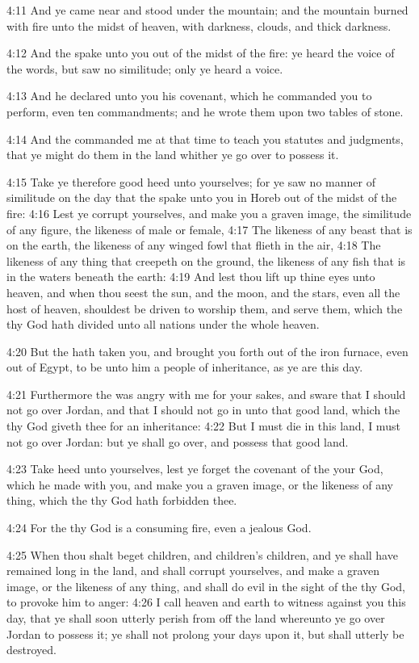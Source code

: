 4:11 And ye came near and stood under the mountain; and the mountain
burned with fire unto the midst of heaven, with darkness, clouds, and
thick darkness.

4:12 And the \LORD spake unto you out of the midst of the fire: ye
heard the voice of the words, but saw no similitude; only ye heard a
voice.

4:13 And he declared unto you his covenant, which he commanded you to
perform, even ten commandments; and he wrote them upon two tables of
stone.

4:14 And the \LORD commanded me at that time to teach you statutes and
judgments, that ye might do them in the land whither ye go over to
possess it.

4:15 Take ye therefore good heed unto yourselves; for ye saw no manner
of similitude on the day that the \LORD spake unto you in Horeb out of
the midst of the fire: 4:16 Lest ye corrupt yourselves, and make you a
graven image, the similitude of any figure, the likeness of male or
female, 4:17 The likeness of any beast that is on the earth, the
likeness of any winged fowl that flieth in the air, 4:18 The likeness
of any thing that creepeth on the ground, the likeness of any fish
that is in the waters beneath the earth: 4:19 And lest thou lift up
thine eyes unto heaven, and when thou seest the sun, and the moon, and
the stars, even all the host of heaven, shouldest be driven to worship
them, and serve them, which the \LORD thy God hath divided unto all
nations under the whole heaven.

4:20 But the \LORD hath taken you, and brought you forth out of the
iron furnace, even out of Egypt, to be unto him a people of
inheritance, as ye are this day.

4:21 Furthermore the \LORD was angry with me for your sakes, and sware
that I should not go over Jordan, and that I should not go in unto
that good land, which the \LORD thy God giveth thee for an inheritance:
4:22 But I must die in this land, I must not go over Jordan: but ye
shall go over, and possess that good land.

4:23 Take heed unto yourselves, lest ye forget the covenant of the
\LORD your God, which he made with you, and make you a graven image, or
the likeness of any thing, which the \LORD thy God hath forbidden thee.

4:24 For the \LORD thy God is a consuming fire, even a jealous God.

4:25 When thou shalt beget children, and children's children, and ye
shall have remained long in the land, and shall corrupt yourselves,
and make a graven image, or the likeness of any thing, and shall do
evil in the sight of the \LORD thy God, to provoke him to anger: 4:26 I
call heaven and earth to witness against you this day, that ye shall
soon utterly perish from off the land whereunto ye go over Jordan to
possess it; ye shall not prolong your days upon it, but shall utterly
be destroyed.

